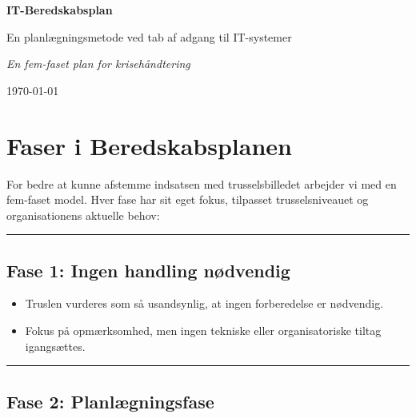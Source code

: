 \documentclass[a4paper,11pt]{book}
\begin{document}
\begin{titlepage}
    \centering
    \vspace*{2cm}
    {\Huge\bfseries IT-Beredskabsplan\par}
    \vspace{1cm}
    {\Large En planlægningsmetode ved tab af adgang til IT-systemer\par}
    \vspace{2cm}
    
    \vspace{2cm}
    {\Large\itshape En fem-faset plan for krisehåndtering\par}
    \vfill
    
    {\large \today\par}
\end{titlepage}

\tableofcontents
\newpage

\chapter{Faser i Beredskabsplanen}\label{faser-i-beredskabsplanen}

For bedre at kunne afstemme indsatsen med trusselsbilledet arbejder vi
med en fem-faset model. Hver fase har sit eget fokus, tilpasset
trusselsniveauet og organisationens aktuelle behov:

\begin{center}\rule{0.5\linewidth}{0.5pt}\end{center}

\section{Fase 1: Ingen handling
nødvendig}\label{fase-1-ingen-handling-nuxf8dvendig}

\begin{itemize}
\tightlist
\item
  Truslen vurderes som så usandsynlig, at ingen forberedelse er
  nødvendig.
\item
  Fokus på opmærksomhed, men ingen tekniske eller organisatoriske tiltag
  igangsættes.
\end{itemize}

\begin{center}\rule{0.5\linewidth}{0.5pt}\end{center}

\section{Fase 2: Planlægningsfase}\label{fase-2-planluxe6gningsfase}
\end{document}
